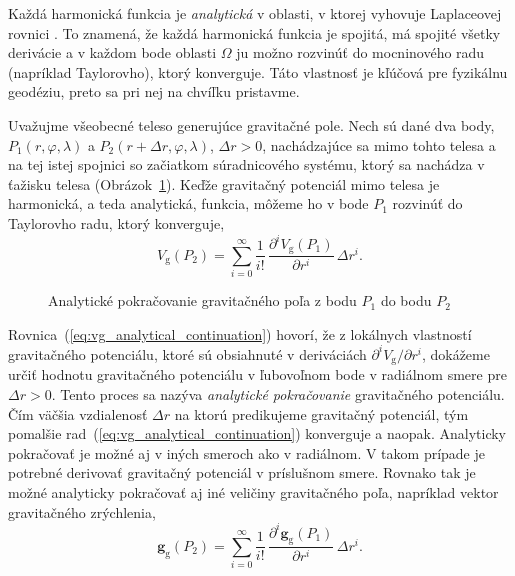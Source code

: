 \documentclass[a4paper, 12pt]{book}
\newcommand{\gidx}{\mathrm g}
\let\vec\mathbf
\begin{document}
Každá harmonická funkcia je \emph{analytická} v oblasti, v ktorej vyhovuje 
Laplaceovej rovnici \citep{MoritzPhysicalGeodesy}.  To znamená, že každá 
harmonická funkcia je spojitá, má spojité všetky derivácie a v každom bode 
oblasti $\Omega$ ju možno rozvinúť do mocninového radu (napríklad Taylorovho), 
ktorý konverguje.  Táto vlastnosť je kľúčová pre fyzikálnu geodéziu, preto sa 
pri nej na chvíľku pristavme.

Uvažujme všeobecné teleso generujúce gravitačné pole.  Nech sú dané dva body, 
$P_1(r, \varphi, \lambda)$ a $P_2(r + \Delta r, \varphi, \lambda)$, $\Delta 
r > 0$, nachádzajúce sa mimo tohto telesa a na tej istej spojnici so začiatkom 
súradnicového systému, ktorý sa nachádza v ťažisku telesa 
(Obrázok~\ref{fig:analytical_continuation}).  Keďže gravitačný potenciál mimo 
telesa je harmonická, a teda analytická, funkcia, môžeme ho v bode $P_1$ 
rozvinúť do Taylorovho radu, ktorý konverguje,
%
\begin{equation}
\label{eq:vg_analytical_continuation}
V_\gidx(P_2) = \sum_{i = 0}^\infty \frac{1}{i!} \, \frac{\partial^i 
V_\gidx(P_1)}{\partial r^i} \, \Delta r^i{.}
\end{equation}

\begin{figure}
\centering

\caption{Analytické pokračovanie gravitačného poľa z bodu $P_1$ do bodu $P_2$}
\label{fig:analytical_continuation}
\end{figure}

Rovnica~(\ref{eq:vg_analytical_continuation}) hovorí, že z lokálnych vlastností 
gravitačného potenciálu, ktoré sú obsiahnuté v deriváciách $\partial^i V_\gidx 
\slash \partial r^i$, dokážeme určiť hodnotu gravitačného potenciálu 
v ľubovoľnom bode v radiálnom smere pre $\Delta r > 0$.  Tento proces sa nazýva 
\emph{analytické pokračovanie} gravitačného potenciálu.  Čím väčšia vzdialenosť 
$\Delta r$ na ktorú predikujeme gravitačný potenciál, tým pomalšie 
rad~(\ref{eq:vg_analytical_continuation}) konverguje a naopak.  Analyticky 
pokračovať je možné aj v iných smeroch ako v radiálnom.  V takom prípade je 
potrebné derivovať gravitačný potenciál v príslušnom smere.  Rovnako tak je 
možné analyticky pokračovať aj iné veličiny gravitačného poľa, napríklad vektor 
gravitačného zrýchlenia,
%
\begin{equation}
\vec g_\gidx(P_2) = \sum_{i = 0}^{\infty} \frac{1}{i!} \, \frac{\partial^i \vec 
g_\gidx(P_1)}{\partial r^i} \, \Delta r^i{.}
\end{equation}
\end{document}
